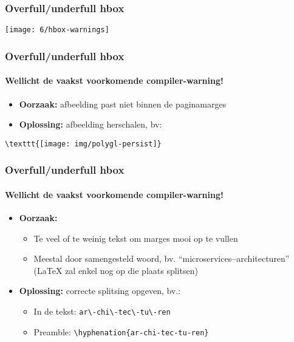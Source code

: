 \documentclass[aspectratio=169]{beamer}
\begin{document}
\begin{frame}
  \frametitle{Overfull/underfull hbox}

  \texttt{[image: 6/hbox-warnings]}

\end{frame}

\begin{frame}[fragile]
  \frametitle{Overfull/underfull hbox}
  \framesubtitle{Wellicht de vaakst voorkomende compiler-warning!}

  \begin{itemize}
    \item \textbf{Oorzaak:} afbeelding past niet binnen de paginamarges
    \item \textbf{Oplossing:} afbeelding herschalen, bv:
  \end{itemize}

\begin{verbatim}
\texttt{[image: img/polygl-persist]}
\end{verbatim}

\end{frame}

\begin{frame}[fragile]
  \frametitle{Overfull/underfull hbox}
  \framesubtitle{Wellicht de vaakst voorkomende compiler-warning!}

  \begin{itemize}
    \item \textbf{Oorzaak:}
    \begin{itemize}
      \item Te veel of te weinig tekst om marges mooi op te vullen
      \item Meestal door samengesteld woord, bv. ``microservices\textcolor{red}{\textbf{--}}architecturen''
      ({\LaTeX} zal enkel nog op die plaats splitsen)
    \end{itemize}
    \item \textbf{Oplossing:} correcte splitsing opgeven, bv.:
    \begin{itemize}
      \item In de tekst: \verb|ar\-chi\-tec\-tu\-ren|
      \item Preamble: \verb|\hyphenation{ar-chi-tec-tu-ren}|
    \end{itemize}
  \end{itemize}

\end{frame}
\end{document}
